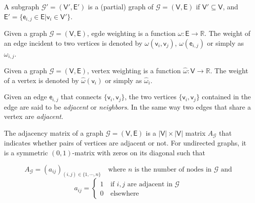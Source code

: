 \begin{definition}[Subgraph]
	A subgraph $\mathcal{G}'= (\mathsf{V}', \mathsf{E}')$ is a (partial) graph of $\mathcal{G}=(\mathsf{V}, \mathsf{E})$ if $\mathsf{V}' \subseteq \mathsf{V}$, and  $\mathsf{E}'= \{\mathsf{e}_{i,j} \in \mathsf{E} | \mathsf{v}_i \in \mathsf{V}' \}$.
\end{definition}

\begin{definition}
	Given a graph $\mathcal{G}=(\mathsf{V}, \mathsf{E})$, egde weighting is a function $\omega: \mathsf{E} \rightarrow \mathbb{R}$. The weight of an edge incident to two vertices is denoted by  $\omega(\mathsf{v}_{i}, \mathsf{v}_{j})$, $ \omega(\mathsf{e}_{i,j})$ or simply as $\omega_{i,j}$.
\end{definition}

\begin{definition}
	Given a graph $\mathcal{G}=(\mathsf{V}, \mathsf{E})$, vertex weighting is a function $\hat{\omega}: \mathsf{V} \rightarrow \mathbb{R}$. The weight of a vertex is denoted by  $\hat{\omega}(\mathsf{v}_{i})$ or simply as $\hat{\omega}_{i}$.
\end{definition}

\begin{definition}[Adjacency]
	Given an edge $\mathsf{e}_{i,j}$ that connects $\{\mathsf{v}_{i}, \mathsf{v}_{j}\} $, the two vertices $\{\mathsf{v}_{i}, \mathsf{v}_{j}\}$ contained in the edge are said to be \textit{adjacent} or \textit{neighbors}. In the same way two edges that share a vertex are \textit{adjacent}.
\end{definition}

\begin{definition}
	The adjacency matrix of a graph $\mathcal{G}=(\mathsf{V}, \mathsf{E})$ is a $|\mathsf{V}| \times |\mathsf{V}|$ matrix $A_{\mathcal{G}}$ that indicates whether pairs of vertices are adjacent or not. For undirected graphs, it is a symmetric $(0,1)$-matrix with zeros on its diagonal such that 
	
	\begin{equation}	
		A_{\mathcal{G}} = (a_{ij})_{(i, j)\in \{1,\cdots, n\}}  \quad \text{where $n$ is the number of nodes in $\mathcal{G}$ and} \nonumber 		
	\end{equation}
	\begin{equation}	
		a_{ij}= 
		\begin{cases}
			1 \quad \text{if $i, j$ are adjacent in $\mathcal{G}$} \\
			0 \quad \text{elsewhere}
		\end{cases}		\nonumber		
	\end{equation}


\end{definition}



